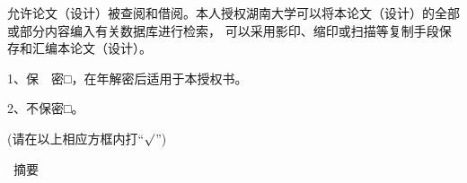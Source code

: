 {{{                允许论文（设计）被查阅和借阅。本人授权湖南大学可以将本论文（设计）的全部或部分内容编入有关数据库进行检索，
                可以采用影印、缩印或扫描等复制手段保存和汇编本论文（设计）。
            }\par
            \song{}\par
            \vspace{-0.25em}\hspace{7.5em}1、保　密□，在\underline{\hspace{4em}}年解密后适用于本授权书。\par
            \vspace{-0.25em}\hspace{7.5em}2、不保密□。\par
            \vspace{-0.25em}\hspace{7.5em}(请在以上相应方框内打``$\surd$'')\par
            \vspace{1em}
            \song{}
            \par\vspace{0.25em}
            \song{}
        }
        \clearpage

         {
            \begin{center}
                \hei\xiaoer{\@title}
            \end{center}
            \vspace{-10pt}
            \begin{center}
                \hei\xiaoer\ 摘\qquad 要
            \end{center}\par
            \song{}\@cabstract
            \vspace{\baselineskip}
            \hangindent=52.3pt
            \newline\noindent
            {\hei{} \hei\xiaosi\@ckeywords}
        }
        \clearpage
        
}
